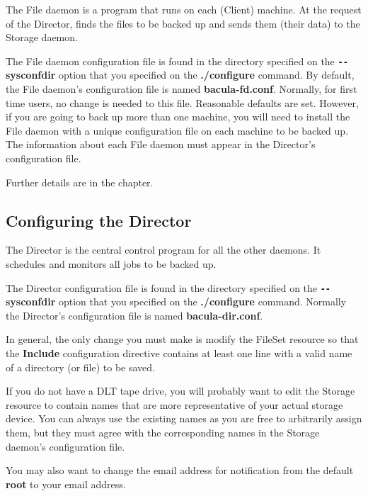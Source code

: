 The File daemon is a program that runs on each (Client) machine. At the
request of the Director, finds the files to be backed up and sends them (their
data) to the Storage daemon. 

The File daemon configuration file is found in the directory specified on
the {\bf \verb:--:sysconfdir} option that you specified on the {\bf ./configure}
command. By default, the File daemon's configuration file is named {\bf
bacula-fd.conf}. Normally, for first time users, no change is needed to this
file. Reasonable defaults are set. However, if you are going to back up more
than one machine, you will need to install the File daemon with a unique
configuration file on each machine to be backed up. The information about each
File daemon must appear in the Director's configuration file. 

Further details are in the 
 chapter.

\subsection{Configuring the Director}

The Director is the central control program for all the other daemons. It
schedules and monitors all jobs to be backed up. 

The Director configuration file is found in the directory specified on the
{\bf \verb:--:sysconfdir} option that you specified on the {\bf ./configure}
command. Normally the Director's configuration file is named {\bf bacula-dir.conf}. 

In general, the only change you must make is modify the FileSet resource so
that the {\bf Include} configuration directive contains at least one line with
a valid name of a directory (or file) to be saved. 

If you do not have a DLT tape drive, you will probably want to edit the
Storage resource to contain names that are more representative of your actual
storage device. You can always use the existing names as you are free to
arbitrarily assign them, but they must agree with the corresponding names in
the Storage daemon's configuration file. 

You may also want to change the email address for notification from the
default {\bf root} to your email address. 


